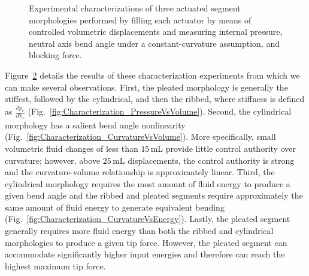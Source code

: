 \begin{figure}[htb]
\begin{subfigure}[b]{0.95\columnwidth}
            \caption{}
            \label{fig:Characterization_ForceVsEnergy}
        \end{subfigure}
        \caption[Experimental characterizations of three actuated segment morphologies.]{Experimental characterizations of three actuated segment morphologies performed by filling each actuator by means of controlled volumetric displacements and measuring internal pressure, neutral axis bend angle under a constant-curvature assumption, and blocking force.}\label{fig:actuator_characterization}
\end{figure}

Figure~\ref{fig:actuator_characterization} details the results of these characterization experiments from which we can make several observations.
%
First, the pleated morphology is generally the stiffest, followed by the cylindrical, and then the ribbed, where stiffness is defined as $\frac{\partial p_c}{\partial \mathbb{V}_c}$ (Fig.~\ref{fig:Characterization_PressureVsVolume}).
%
Second, the cylindrical morphology has a salient bend angle nonlinearity (Fig.~\ref{fig:Characterization_CurvatureVsVolume}).
%
More specifically, small volumetric fluid changes of less than $15\,$mL provide little control authority over curvature; however, above $25\,$mL displacements, the control authority is strong and the curvature-volume relationship is approximately linear.
%
Third, the cylindrical morphology requires the most amount of fluid energy to produce a given bend angle and the ribbed and pleated segments require approximately the same amount of fluid energy to generate equivalent bending (Fig.~\ref{fig:Characterization_CurvatureVsEnergy}).
%
Lastly, the pleated segment generally requires more fluid energy than both the ribbed and cylindrical morphologies to produce a given tip force.
%
However, the pleated segment can accommodate significantly higher input energies and therefore can reach the highest maximum tip force. 